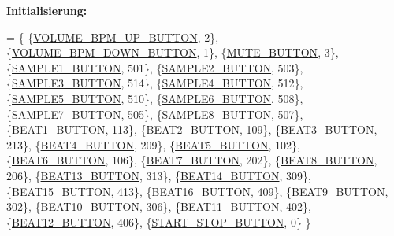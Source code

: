 {\bfseries Initialisierung\+:}
\begin{DoxyCode}
= \{
            \{\hyperlink{namespaceinputs_ab1d58fe937ccabff6ec4011a74028bfb}{VOLUME\_BPM\_UP\_BUTTON},   2\},
            \{\hyperlink{namespaceinputs_af3cad6ab00b2670e1710698945d28c17}{VOLUME\_BPM\_DOWN\_BUTTON}, 1\},
            \{\hyperlink{namespaceinputs_af0075a72395787966efcec2403306b43}{MUTE\_BUTTON},            3\},
            \{\hyperlink{namespaceinputs_a39dbaf6935309e198c1a0bc6e3468c45}{SAMPLE1\_BUTTON},         501\},
            \{\hyperlink{namespaceinputs_afcf2086c7f58f801e5654d8e573d928c}{SAMPLE2\_BUTTON},         503\},
            \{\hyperlink{namespaceinputs_a17158d35ca30fb91c6f9f757ce0d7ccc}{SAMPLE3\_BUTTON},         514\},
            \{\hyperlink{namespaceinputs_ac9ccac580f0955e454a367ddc6421d78}{SAMPLE4\_BUTTON},         512\},
            \{\hyperlink{namespaceinputs_ad22ade847b4a38fd418dccda07814551}{SAMPLE5\_BUTTON},         510\},
            \{\hyperlink{namespaceinputs_a88edcfa8b89df1abcca33bcec05974c4}{SAMPLE6\_BUTTON},         508\},
            \{\hyperlink{namespaceinputs_a50972dcf524a7b7c420ca75b0ba72a29}{SAMPLE7\_BUTTON},         505\},
            \{\hyperlink{namespaceinputs_a85f389284c616cd584390d04ad192ced}{SAMPLE8\_BUTTON},         507\},
            \{\hyperlink{namespaceinputs_af62021422f469c370f42c78a72504a66}{BEAT1\_BUTTON},           113\},
            \{\hyperlink{namespaceinputs_a8cdd33c9e53b617a2cf8bd32a5b74484}{BEAT2\_BUTTON},           109\},
            \{\hyperlink{namespaceinputs_ab60a6fc2188a034f76d3fbe554efe314}{BEAT3\_BUTTON},           213\},
            \{\hyperlink{namespaceinputs_af65f26f63a9572003a2bc49e7955e319}{BEAT4\_BUTTON},           209\},
            \{\hyperlink{namespaceinputs_a8a027829529daa53a24ece7b8334164b}{BEAT5\_BUTTON},           102\},
            \{\hyperlink{namespaceinputs_a6afdc23bce21454342081cf937e47ab9}{BEAT6\_BUTTON},           106\},
            \{\hyperlink{namespaceinputs_ac74e302394a578b31f0cf44df8cbb1a9}{BEAT7\_BUTTON},           202\},
            \{\hyperlink{namespaceinputs_abfcd4d28221c436391131a27402ea620}{BEAT8\_BUTTON},           206\},
            \{\hyperlink{namespaceinputs_a8f9d547eaa8c52cebfa64221341f266a}{BEAT13\_BUTTON},          313\},
            \{\hyperlink{namespaceinputs_a4dfd34a5656f72c71f1b2dd8efc963dc}{BEAT14\_BUTTON},          309\},
            \{\hyperlink{namespaceinputs_a1952aa2d27b65c8d8899a1ae1cfb7bb9}{BEAT15\_BUTTON},          413\},
            \{\hyperlink{namespaceinputs_af0f3099a06352ba4eb0808091b908178}{BEAT16\_BUTTON},          409\},
            \{\hyperlink{namespaceinputs_af628ea84bf7114a62249d4bb425ed06a}{BEAT9\_BUTTON},           302\},
            \{\hyperlink{namespaceinputs_a9778bcf3a44a9d16ae156bac6d745a24}{BEAT10\_BUTTON},          306\},
            \{\hyperlink{namespaceinputs_ad09e4010a8b08721988599b198645372}{BEAT11\_BUTTON},          402\},
            \{\hyperlink{namespaceinputs_a7b6bb44b9241cac31ff9909c3fc88271}{BEAT12\_BUTTON},          406\},
            \{\hyperlink{namespaceinputs_ab1d04ae8b7a7f4d11849c110f20fae10}{START\_STOP\_BUTTON},      0\}
    \}
\end{DoxyCode}


